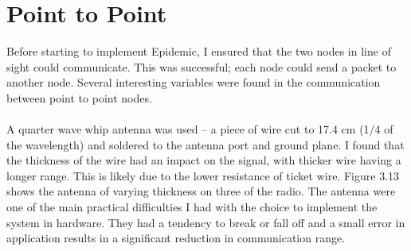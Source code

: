 \documentclass[12pt,a4paper]{report}
\begin{document}
\section{Point to Point}
Before starting to implement Epidemic, I ensured that the two nodes in line of sight could communicate. This was successful; each node could send a packet to another node. Several interesting variables were found in the communication between point to point nodes. \\ \\
A quarter wave whip antenna was used -- a piece of wire cut to 17.4 cm (1/4 of the wavelength) and soldered to the antenna port and ground plane. I found that the thickness of the wire had an impact on the signal, with thicker wire having a longer range. This is likely due to the lower resistance of ticket wire. Figure 3.13 shows the antenna of varying thickness on three of the radio. The antenna were one of the main practical difficulties I had with the choice to implement the system in hardware. They had a tendency to break or fall off and a small error in application results in a significant reduction in communication range. 
\end{document}

